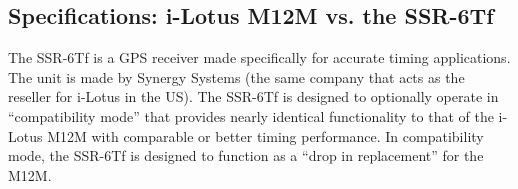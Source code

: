 %
%
%

\subsection{Specifications:  i-Lotus M12M vs. the SSR-6Tf}%
\label{receivers}
The SSR-6Tf is a GPS receiver made specifically for accurate timing
applications.  The unit is made by Synergy Systems (the same company
that acts as the reseller for i-Lotus in the US).  The SSR-6Tf is designed to
optionally operate in ``compatibility mode'' that provides nearly
identical functionality to that of the i-Lotus M12M with comparable or
better timing performance.  In compatibility mode, the SSR-6Tf is
designed to function as a ``drop in replacement'' for the
M12M. 

